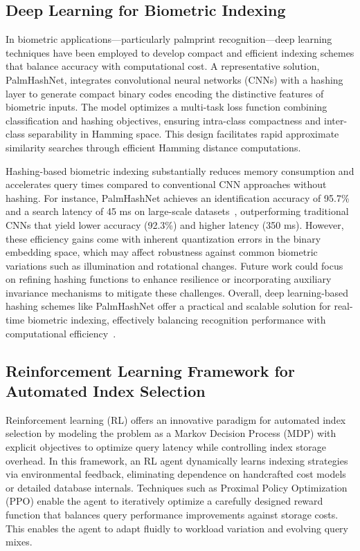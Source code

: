 \documentclass[sigconf]{acmart}
\begin{document}
\subsection{Deep Learning for Biometric Indexing}

In biometric applications—particularly palmprint recognition—deep learning techniques have been employed to develop compact and efficient indexing schemes that balance accuracy with computational cost. A representative solution, PalmHashNet, integrates convolutional neural networks (CNNs) with a hashing layer to generate compact binary codes encoding the distinctive features of biometric inputs. The model optimizes a multi-task loss function combining classification and hashing objectives, ensuring intra-class compactness and inter-class separability in Hamming space. This design facilitates rapid approximate similarity searches through efficient Hamming distance computations.

Hashing-based biometric indexing substantially reduces memory consumption and accelerates query times compared to conventional CNN approaches without hashing. For instance, PalmHashNet achieves an identification accuracy of 95.7\% and a search latency of 45 ms on large-scale datasets~\cite{ref32}, outperforming traditional CNNs that yield lower accuracy (92.3\%) and higher latency (350 ms). However, these efficiency gains come with inherent quantization errors in the binary embedding space, which may affect robustness against common biometric variations such as illumination and rotational changes. Future work could focus on refining hashing functions to enhance resilience or incorporating auxiliary invariance mechanisms to mitigate these challenges. Overall, deep learning-based hashing schemes like PalmHashNet offer a practical and scalable solution for real-time biometric indexing, effectively balancing recognition performance with computational efficiency~\cite{ref32}.

\subsection{Reinforcement Learning Framework for Automated Index Selection}

Reinforcement learning (RL) offers an innovative paradigm for automated index selection by modeling the problem as a Markov Decision Process (MDP) with explicit objectives to optimize query latency while controlling index storage overhead. In this framework, an RL agent dynamically learns indexing strategies via environmental feedback, eliminating dependence on handcrafted cost models or detailed database internals. Techniques such as Proximal Policy Optimization (PPO) enable the agent to iteratively optimize a carefully designed reward function that balances query performance improvements against storage costs. This enables the agent to adapt fluidly to workload variation and evolving query mixes.
\end{document}
